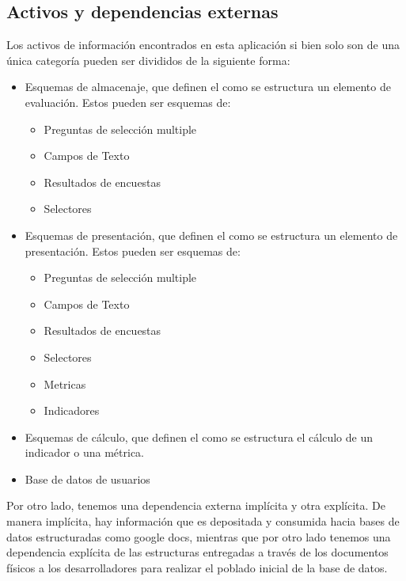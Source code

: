 \subsection{Activos y dependencias externas}

Los activos de información encontrados en esta aplicación si bien solo son de una única categoría pueden ser divididos de la siguiente forma:

\begin{itemize}
    \item{ Esquemas de almacenaje, que definen el como se estructura un elemento de evaluación. Estos pueden ser esquemas de:
        \begin{itemize}
            \item Preguntas de selección multiple
            \item Campos de Texto
            \item Resultados de encuestas
            \item Selectores
        \end{itemize}
    }
    \item{ Esquemas de presentación, que definen el como se estructura un elemento de presentación. Estos pueden ser esquemas de:
        \begin{itemize}
            \item Preguntas de selección multiple
            \item Campos de Texto
            \item Resultados de encuestas
            \item Selectores
            \item Metricas
            \item Indicadores
        \end{itemize}
    }
    \item{ Esquemas de cálculo, que definen el como se estructura el cálculo de un indicador o una métrica.}
    \item { Base de datos de usuarios }
\end{itemize}

Por otro lado, tenemos una dependencia externa implícita y otra explícita. De manera implícita, hay información que es depositada y consumida hacia bases de datos estructuradas como google docs, mientras que por otro lado tenemos una dependencia explícita de las estructuras entregadas a través de los documentos físicos a los desarrolladores para realizar el poblado inicial de la base de datos.

